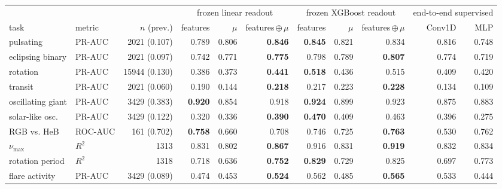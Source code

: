 \setlength{\tabcolsep}{3pt}
\begin{tabular}{llrrrrrrrrr}
\toprule
 & & & \multicolumn{3}{c}{frozen linear readout} & \multicolumn{3}{c}{frozen XGBoost readout} & \multicolumn{2}{c}{end-to-end supervised} \\
\cmidrule(lr){4-6}\cmidrule(lr){7-9}\cmidrule(lr){10-11}
task & metric & $n$ (prev.) & features & $\mu$ & features\,$\oplus$\,$\mu$ & features & $\mu$ & features\,$\oplus$\,$\mu$ & Conv1D & MLP \\
\midrule
pulsating & PR-AUC & 2021 (0.107) & 0.789 & 0.806 & \textbf{0.846} & \textbf{0.845} & 0.821 & 0.834 & 0.816 & 0.748 \\
eclipsing binary & PR-AUC & 2021 (0.097) & 0.742 & 0.771 & \textbf{0.775} & 0.798 & 0.789 & \textbf{0.807} & 0.774 & 0.719 \\
rotation & PR-AUC & 15944 (0.130) & 0.386 & 0.373 & \textbf{0.441} & \textbf{0.518} & 0.436 & 0.515 & 0.409 & 0.420 \\
transit & PR-AUC & 2021 (0.060) & 0.190 & 0.144 & \textbf{0.218} & 0.217 & 0.223 & \textbf{0.228} & 0.134 & 0.109 \\
oscillating giant & PR-AUC & 3429 (0.383) & \textbf{0.920} & 0.854 & 0.918 & \textbf{0.924} & 0.899 & 0.923 & 0.875 & 0.883 \\
solar-like osc. & PR-AUC & 3429 (0.122) & 0.320 & 0.336 & \textbf{0.390} & \textbf{0.470} & 0.409 & 0.463 & 0.396 & 0.275 \\
RGB vs. HeB & ROC-AUC & 161 (0.702) & \textbf{0.758} & 0.660 & 0.708 & 0.746 & 0.725 & \textbf{0.763} & 0.530 & 0.762 \\
$\nu_{\max}$ & $R^2$ & 1313 & 0.831 & 0.802 & \textbf{0.867} & 0.916 & 0.831 & \textbf{0.919} & 0.832 & 0.834 \\
rotation period & $R^2$ & 1318 & 0.718 & 0.636 & \textbf{0.752} & \textbf{0.829} & 0.729 & 0.825 & 0.697 & 0.773 \\
flare activity & PR-AUC & 3429 (0.089) & 0.474 & 0.453 & \textbf{0.524} & 0.562 & 0.485 & \textbf{0.565} & 0.533 & 0.444 \\
\bottomrule
\end{tabular}
